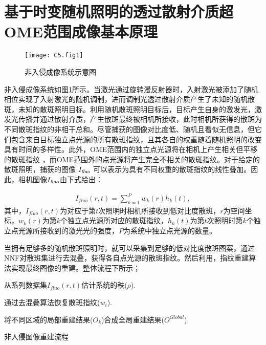 \section{基于时变随机照明的透过散射介质超OME范围成像基本原理}

\begin{figure}[htp]
	\centering
	\texttt{[image: C5.fig1]}
	\caption{非入侵成像系统示意图}
	\label{fig:5.1}
\end{figure}

非入侵成像系统如图\ref{fig:5.1}所示。当激光通过旋转漫反射器时，入射激光被添加了随机相位实现了入射激光的随机调制，进而调制光透过散射介质产生了未知的随机散斑，未知的散斑照明目标。利用随机散斑照明目标后，目标产生自身的激发光，激发光传播并通过散射介质，产生散斑最终被相机所接收，此时相机所获得的散斑为不同散斑指纹的非相干总和。尽管捕获的图像对比度低、随机且看似无信息，但它们包含来自目标独立点光源的所有散斑指纹，且其各自的权重随着随机照明的改变具有时间的多样性。此外，OME范围内的独立点光源将在相机上产生相关但平移的散斑指纹 \cite{Freund1988}，而OME范围外的点光源将产生完全不相关的散斑指纹。对于给定的散斑照明，捕获的图像 $I_{\textsl{fluo}}$ 可以表示为具有不同权重的散斑指纹的线性叠加。因此，相机图像$I_{\textsl{fluo}}$由下式给出：

\begin{equation}
\begin{aligned}
I_{fluo}(r,t) = \sum^{P}_{k=1} w_{k}(r) h_{k}(t),
\label{eq:5.1}
\end{aligned}
\end{equation}
其中，$I_{fluo}(r,t)$为对应于第$t$次照明时相机所接收到低对比度散斑，$r$为空间坐标，$w_{k}(r)$为第$k$个独立点光源所对应的散斑指纹，$h_{k}(t)$为第$t$次照明时第$k$个独立点光源所接收到的激光光的强度，$P$为系统中独立点光源的数量。

当拥有足够多的随机散斑照明时，就可以采集到足够的低对比度散斑图案，通过NNF对散斑集进行去混叠，获得各自点光源的散斑指纹。然后利用，指纹重建算法实现最终图像的重建。整体流程下所示；
\begin{algorithm2e}[h!]
\DontPrintSemicolon
\SetAlgoLined
{}
从系列数据集$I_{fluo}(r,t)$估计系统的秩($\rho$).\;

通过去混叠算法恢复散斑指纹($w_{i}$).\;


将不同区域的局部重建结果($O_{k}$)合成全局重建结果($O^{Global}$).\;

\caption{非入侵图像重建流程}
\label{alg:a1}
\end{algorithm2e}


